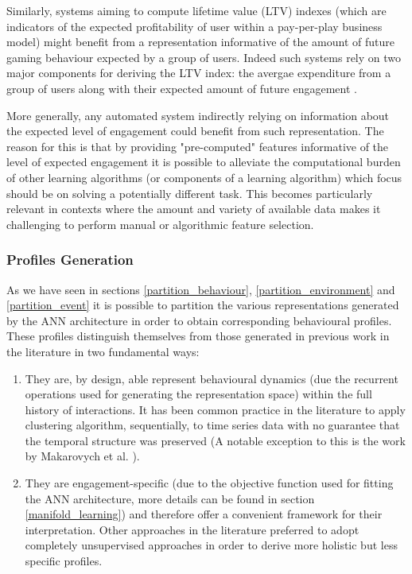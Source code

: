 Similarly, systems aiming to compute lifetime value (LTV) indexes (which are indicators of the expected profitability of user within a pay-per-play business model) might benefit from a representation informative of the  amount of future gaming behaviour expected by a group of users. Indeed such systems rely on two major components for deriving the LTV index: the avergae expenditure from a group of users along with their expected amount of future engagement \cite{chen2018customer}.

More generally, any automated system indirectly relying on information about the expected level of engagement could benefit from such representation. The reason for this is that by providing "pre-computed" features informative of the level of expected engagement it is possible to alleviate the computational burden of other learning algorithms (or components of a learning algorithm)  which focus should be on solving a potentially different task. This becomes particularly relevant in contexts where the amount and variety of available data makes it challenging to perform manual or algorithmic feature selection.

\subsubsection{Profiles Generation}
As we have seen in sections \ref{partition_behaviour}, \ref{partition_environment} and \ref{partition_event} it is possible to partition the various representations generated by the ANN architecture in order to obtain corresponding behavioural profiles. These profiles distinguish themselves from those generated in previous work in the literature \cite{drachen2014comparison, bauckhage2012players, makarovych2018like, aung2018predicting} in two fundamental ways:

\begin{enumerate}
    \item They are, by design, able represent behavioural dynamics (due the recurrent operations used for generating the representation space) within the full history of interactions. It has been common practice in the literature to apply clustering algorithm, sequentially, to time series data \cite{sifa2013behavior,bauckhage2014beyond,aung2018predicting} with no guarantee that the temporal structure was preserved (A notable exception to this is the work by Makarovych et al. \cite{makarovych2018like}).
    \item They are engagement-specific (due to the objective function used for fitting the ANN architecture, more details can be found in section \ref{manifold_learning}) and therefore offer a convenient framework for their interpretation. Other approaches in the literature preferred to adopt completely unsupervised approaches \cite{drachen2014comparison, drachen2012guns} in order to derive more holistic but less specific profiles.
\end{enumerate}

